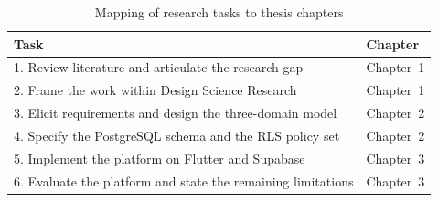 {\singlespacing
\begin{table}[h]
  \caption{Mapping of research tasks to thesis chapters}
  \label{tab:taskmap}
  \centering
  \begin{tabular}{ll}
    \toprule
    \textbf{Task}                                                  & \textbf{Chapter}\\
    \midrule
    1. Review literature and articulate the research gap          & Chapter~1\\
    2. Frame the work within Design Science Research              & Chapter~1\\
    3. Elicit requirements and design the three-domain model      & Chapter~2\\
    4. Specify the PostgreSQL schema and the RLS policy set       & Chapter~2\\
    5. Implement the platform on Flutter and Supabase             & Chapter~3\\
    6. Evaluate the platform and state the remaining limitations  & Chapter~3\\
    \bottomrule
  \end{tabular}
\end{table}
}
